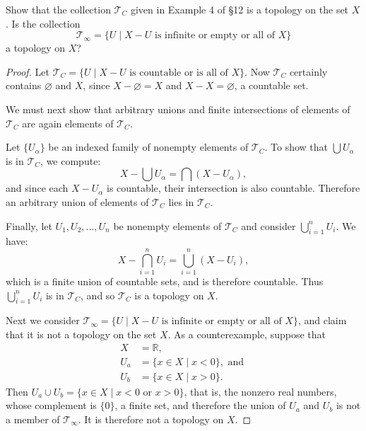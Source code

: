 \documentclass{article}
\begin{document}
Show that the collection $\mathcal{T}_C$ given in Example 4 of §12 is a topology on the set $X$. Is the collection
\begin{equation*}
    \mathcal{T}_\infty = \{ U \mid X - U \text{ is infinite or empty or all of }X \}
\end{equation*}
a topology on $X$?

\begin{proof}
    Let $\mathcal{T}_C = \{ U \mid X - U \text{ is countable or is all of }X \}$. Now $\mathcal{T}_C$ certainly contains $\varnothing$ and $X$, since $X - \varnothing = X$ and $X - X = \varnothing$, a countable set.

    We must next show that arbitrary unions and finite intersections of elements of $\mathcal{T}_C$ are again elements of $\mathcal{T}_C$.

    Let $\{ U_\alpha \}$ be an indexed family of nonempty elements of $\mathcal{T}_C$. To show that $\bigcup U_\alpha$ is in $\mathcal{T}_C$, we compute:
    \begin{equation*}
        X - \bigcup U_\alpha = \bigcap (X - U_\alpha),
    \end{equation*}
    and since each $X - U_\alpha$ is countable, their intersection is also countable. Therefore an arbitrary union of elements of $\mathcal{T}_C$ lies in $\mathcal{T}_C$.

    Finally, let $U_1, U_2, ..., U_n$ be nonempty elements of $\mathcal{T}_C$ and consider $\bigcup_{i = 1}^n U_i$. We have:
    \begin{equation*}
        X - \bigcap_{i = 1}^n U_i = \bigcup_{i = 1}^n (X - U_i),
    \end{equation*}
    which is a finite union of countable sets, and is therefore countable. Thus $\bigcup_{i = 1}^n U_i$ is in $\mathcal{T}_C$, and so $\mathcal{T}_C$ is a topology on $X$.

    Next we consider $\mathcal{T}_\infty = \{ U \mid X - U \text{ is infinite or empty or all of }X \}$, and claim that it is not a topology on the set $X$. As a counterexample, suppose that
    \begin{align*}
        X &= \mathbb{R}, \\
        U_a &= \{ x \in X \mid x < 0 \}, \text{ and } \\
        U_b &= \{ x \in X \mid x > 0 \}.
    \end{align*}
    Then $U_a \cup U_b = \{ x \in X \mid x < 0 \text{ or } x > 0 \}$, that is, the nonzero real numbers, whose complement is $\{ 0 \}$, a finite set, and therefore the union of $U_a$ and $U_b$ is not a member of $\mathcal{T}_\infty$. It is therefore not a topology on $X$.
\end{proof}
\end{document}
